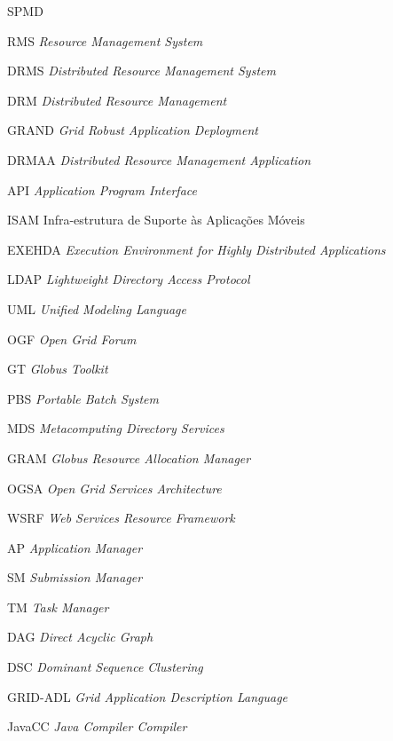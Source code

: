 
\tableofcontents


\begin{listofabbrv}{SPMD}
        \item[RMS]   \emph{Resource Management System}
        \item[DRMS]  \emph{Distributed Resource Management System}
        \item[DRM]   \emph{Distributed Resource Management}
        \item[GRAND] \emph{Grid Robust Application Deployment}
        \item[DRMAA] \emph{Distributed Resource Management Application}
        \item[API]   \emph{Application Program Interface}
        \item[ISAM]  Infra-estrutura de Suporte às Aplicações Móveis
        \item[EXEHDA]\emph{Execution Environment for Highly Distributed Applications}
        \item[LDAP]  \emph{Lightweight Directory Access Protocol}
        \item[UML]   \emph{Unified Modeling Language}
        \item[OGF]   \emph{Open Grid Forum}
        \item[GT]    \emph{Globus Toolkit}
        \item[PBS]   \emph{Portable Batch System}
        \item[MDS]   \emph{Metacomputing Directory Services}
        \item[GRAM]  \emph{Globus Resource Allocation Manager}
        \item[OGSA]  \emph{Open Grid Services Architecture}
        \item[WSRF]  \emph{Web Services Resource Framework}
        \item[AP]    \emph{Application Manager}
        \item[SM]    \emph{Submission Manager}
        \item[TM]    \emph{Task Manager}
        \item[DAG]	\emph{Direct Acyclic Graph}
        \item[DSC]	\emph{Dominant Sequence Clustering}
        \item[GRID-ADL] \emph{Grid Application Description Language}
        \item[JavaCC]\emph{Java Compiler Compiler}

\end{listofabbrv}
